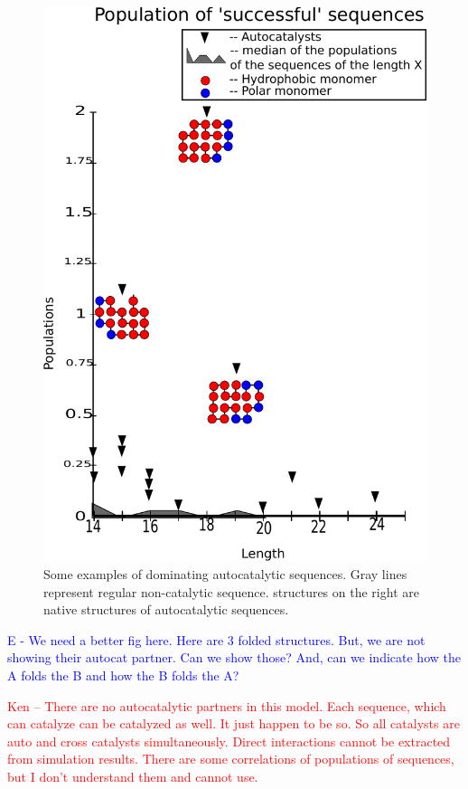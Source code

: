\documentclass[journal=jacsat,manuscript=article,layout=twocolumn]{achemso}
\newcommand*{\red}[1]{\textcolor{red}{#1}}
\newcommand*{\blue}[1]{\textcolor{blue}{#1}}
\begin{document}
\begin{figure}[h!]
  \centering
  \includegraphics[width=\columnwidth]{pictures/good_seqs.pdf} 
  \caption{Some examples of dominating autocatalytic sequences. Gray lines represent regular 
non-catalytic sequence. structures on the right are native structures of autocatalytic sequences. }
  \label{fig:example1}
\end{figure}
\blue{E - We need a better fig here.  Here are 3 folded structures.  But, we are not showing 
their autocat partner.  Can we show those?  And, can we indicate how the A folds the B and how the 
B 
folds the A?}

\red{Ken -- There are no autocatalytic partners in this model. Each sequence, which can catalyze 
can be catalyzed as well. It just happen to be so. So all catalysts are auto and cross 
catalysts simultaneously. Direct interactions cannot be extracted from simulation results. There are 
some correlations of populations of sequences, but I don't understand them and cannot use.}
\end{document}
